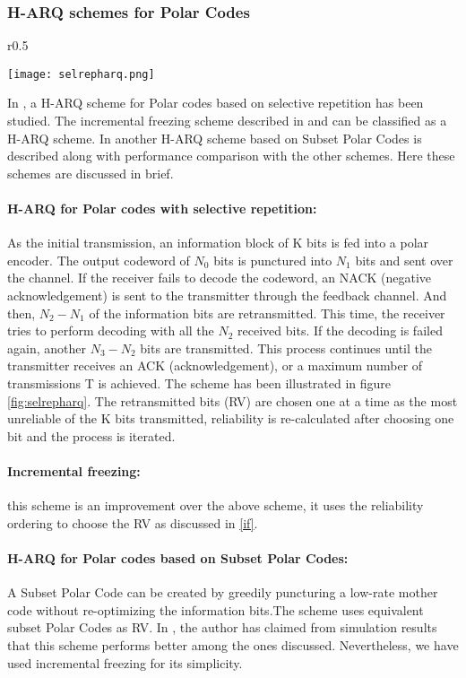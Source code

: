 \documentclass[
11pt, %
a4paper, %
oneside, %
headinclude,footinclude, %
BCOR5mm, %
]{scrartcl}
\begin{document}
\subsubsection*{H-ARQ schemes for Polar Codes}
\begin{wrapfigure}{r}{0.5\textwidth}
  \begin{center}
    \texttt{[image: selrepharq.png]}
  \end{center}
  \caption{H-ARQ for Polar Codes with selective repetition}
  \label{fig:selrepharq}
\end{wrapfigure}
In \cite{harqchen}, a H-ARQ scheme for Polar codes based on selective repetition has been studied. The incremental freezing scheme described in \cite{chen} and \cite{mondelli} can be classified as a H-ARQ scheme. In \cite{harqtav} another H-ARQ scheme based on Subset Polar Codes is described along with performance comparison with the other schemes. Here these schemes are discussed in brief. 
\paragraph{H-ARQ for Polar codes with selective repetition:}
As the initial transmission, an information block of K bits is fed into a polar
encoder. The output codeword of $N_0$ bits is punctured into $N_1$
bits and sent over the channel. If the receiver fails to decode
the codeword, an NACK (negative acknowledgement) is sent
to the transmitter through the feedback channel. And then,
$N_2-N_1$ of the information bits are retransmitted. This time,
the receiver tries to perform decoding with all the $N_2$ received
bits. If the decoding is failed again, another $N_3-N_2$ bits
are transmitted. This process continues until the transmitter
receives an ACK (acknowledgement), or a maximum number
of transmissions T is achieved. The scheme has been illustrated in figure  \ref{fig:selrepharq}. The retransmitted bits (RV) are chosen one at a time as the most unreliable of the K bits transmitted, reliability is re-calculated after choosing one bit and the process is iterated.
\paragraph{Incremental freezing:} this scheme is an improvement over the above scheme, it uses the reliability ordering to choose the RV as discussed in \ref{if}.
\paragraph{H-ARQ for Polar codes based on Subset Polar Codes:}
A Subset Polar Code can be created by greedily puncturing a low-rate mother code without re-optimizing the information bits.The scheme uses equivalent subset Polar Codes as RV. In \cite{harqtav}, the author has claimed from simulation results that this scheme performs better among the ones discussed. Nevertheless, we have used incremental freezing for its simplicity.  
\end{document}
